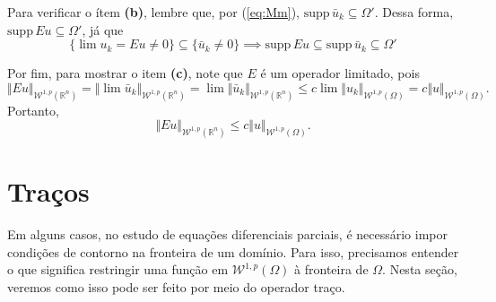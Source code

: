 \documentclass[a4paper, 11pt]{book}
\theoremstyle{definition}
\newcommand{\bR}{\mathbb{R}}
\newcommand{\cW}{\mathcal{W}}
\newcommand{\supp}{\mathrm{supp}\,}
\begin{document}
\begin{prf}
    Para verificar o ítem \textbf{(b)}, lembre que, por (\ref{eq:Mm}), $\supp \bar u_k \subseteq \Omega'$.
    Dessa forma, $\supp Eu \subseteq \Omega'$, já que
    \[
        \{ \lim u_k = Eu \neq 0\} \subseteq \{ \bar u_k \neq 0 \} \implies \supp Eu \subseteq \supp \bar u_k \subseteq \Omega'
    \]

    Por fim, para mostrar o item \textbf{(c)}, note que $E$ é um operador limitado, pois
    \[
        \Vert Eu \Vert_{\cW^{1,p}(\bR^n)} = \Vert \lim \bar u_k \Vert_{\cW^{1,p}(\bR^n)} = \lim \Vert \bar u_k \Vert_{\cW^{1,p}(\bR^n)} \leqslant c \lim \Vert u_k \Vert_{\cW^{1,p}(\Omega)} = c \Vert u \Vert_{\cW^{1,p}(\Omega)}.
    \]
    Portanto,
    \[
        \Vert Eu \Vert_{\cW^{1,p}(\bR^n)} \leqslant c \Vert u \Vert_{\cW^{1,p}(\Omega)}.
    \]
\end{prf}

\section{Traços}

Em alguns casos, no estudo de equações diferenciais parciais, é necessário impor condições de contorno na fronteira de um domínio. Para isso, precisamos entender o que significa restringir uma função em $\cW^{1,p}(\Omega)$ à fronteira de $\Omega$. Nesta seção, veremos como isso pode ser feito por meio do operador traço.
\end{document}
